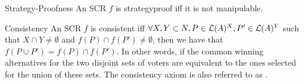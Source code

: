 	\begin{genthm}{Strategy-Proofness}
		An \acs{SCR} $f$ is strategyproof iff it is not manipulable.
	\end{genthm}

	\begin{genthm}{Consistency}
		An \acs{SCR} $f$ is consistent iff $\forall X,Y \subset N, P \in\mathcal{L}(A)^{X}, P' \in\mathcal{L}(A)^{Y}$ such that $X \cap Y \neq \emptyset$ and $f(P)\cap f(P') \neq \emptyset$, then we have that $f(P \cup P')=f(P)\cap f(P')$. In other words, if the common winning alternatives for the two disjoint sets of voters are equivalent to the ones selected for the union of these sets.
		The consistency axiom is also referred to as .
	\end{genthm}

%
%
	
